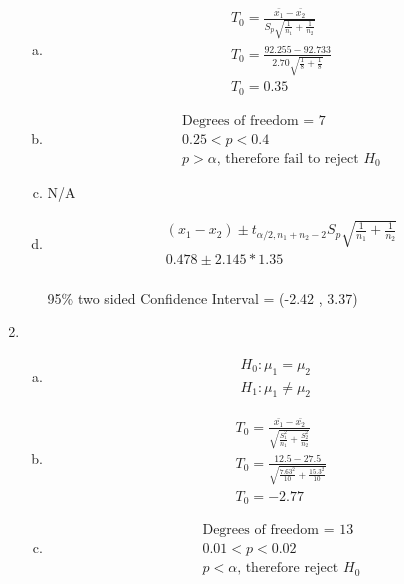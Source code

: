 \documentclass[14pt]{article}
\begin{document}
\begin{enumerate}
\begin{enumerate}[(a)]
\item
\begin{align*}
& T_0 = \frac{\bar{x_1} - \bar{x_2}}{S_p \sqrt{\frac{1}{n_1} + \frac{1}{n_2}}} \\[15pt]
& T_0 = \frac{92.255 - 92.733}{2.70 \sqrt{\frac{1}{8} + \frac{1}{8}}} \\[15pt]
& T_0 = 0.35
\end{align*}

\item
\begin{align*}
& \text{Degrees of freedom = } 7 \\[15pt]
& 0.25 < p < 0.4 \\[15pt]
& p > \alpha \text{, therefore fail to reject } H_0 
\end{align*}

\item
N/A

\item
\begin{align*}
& (x_1 - x_2) \pm t_{\alpha / 2, n_1 + n_2 -2} S_p \sqrt{\frac{1}{n_1} + \frac{1}{n_2}} \\[15pt]
& 0.478 \pm 2.145 * 1.35 \\[15pt]
\end{align*}

95\% two sided Confidence Interval = (-2.42 , 3.37)

\end{enumerate}

\item

\begin{enumerate}[(a)]
\item
\begin{align*}
H_0: \mu_1 = \mu_2 \\[15pt]
H_1: \mu_1 \neq \mu_2
\end{align*}

\item
\begin{align*}
& T_0 = \frac{\bar{x_1} - \bar{x_2}}{\sqrt{\frac{S_1^2}{n_1} + \frac{S_2^2}{n_2}}} \\[15pt]
& T_0 = \frac{12.5 - 27.5}{\sqrt{\frac{7.63^2}{10} + \frac{15.3^2}{10}}} \\[15pt]
& T_0 = -2.77
\end{align*}

\item
\begin{align*}
& \text{Degrees of freedom = } 13 \\[15pt]
& 0.01 < p < 0.02 \\[15pt]
& p < \alpha \text{, therefore reject } H_0 
\end{align*}


\end{enumerate}
\end{enumerate}
\end{document}
